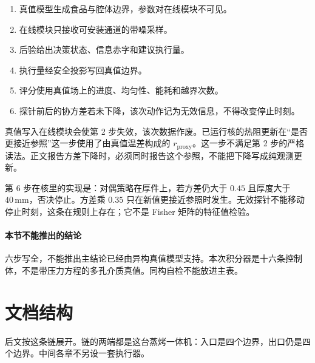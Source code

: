 \begin{enumerate}
\item 真值模型生成食品与腔体边界，参数对在线模块不可见。
\item 在线模块只接收可安装通道的带噪采样。
\item 后验给出决策状态、信息赤字和建议执行量。
\item 执行量经安全投影写回真值边界。
\item 评分使用真值场上的进度、均匀性、能耗和越界次数。
\item 探针前后的协方差若未下降，该次动作记为无效信息，不得改变停止时刻。
\end{enumerate}

真值写入在线模块会使第 2 步失效，该次数据作废。已运行核的热阻更新在“是否更接近参照”这一步使用了由真值温差构成的 \(r_{\mathrm{proxy}}\)。这一步不满足第 2 步的严格读法。正文报告方差下降时，必须同时报告这个参照，不能把下降写成纯观测更新。

第 6 步在核里的实现是：对偶策略在厚件上，若方差仍大于 \(0.45\) 且厚度大于 \(40\,\mathrm{mm}\)，否决停止。方差乘 \(0.35\) 只在新值更接近参照时发生。无效探针不能移动停止时刻，这条在规则上存在；它不是 Fisher 矩阵的特征值检验。

\paragraph{本节不能推出的结论}
六步写全，不能推出主结论已经由异构真值模型支持。本次积分器是十六条控制体，不是带压力方程的多孔介质真值。同构自检不能放进主表。

\section{文档结构}

后文按这条链展开。链的两端都是这台蒸烤一体机：入口是四个边界，出口仍是四个边界。中间各章不另设一套执行器。

